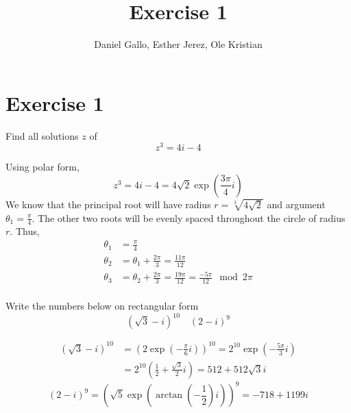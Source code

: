 \documentclass{report}
\title{Exercise 1}
\author{Daniel Gallo, Esther Jerez, Ole Kristian}
\renewcommand{\exp}[1]{\operatorname{exp}\left(#1\right)}
\renewcommand{\arctan}[1]{\operatorname{arctan} \left(#1\right)}
\begin{document}
    \maketitle
    
    \section*{Exercise 1}
    \begin{tcolorbox}[title=Part a]
        Find all solutions $z$ of
        \begin{equation*}
            z^3 = 4i - 4
        \end{equation*}
    \end{tcolorbox}
    \noindent
    Using polar form,
    \begin{equation*}
        z^3 = 4i - 4 = 4\sqrt{2}\exp{\frac{3\pi}{4}i}
    \end{equation*}
    We know that the principal root will have radius $r = \sqrt[3]{4\sqrt{2}}$ and argument $\theta_1 = \frac{\pi}{4}$. The other two roots will be evenly spaced throughout the circle of radius $r$. Thus,
    \begin{align*}
        \theta_1 &= \frac{\pi}{4} \\
        \theta_2 &= \theta_1 + \frac{2\pi}{3} = \frac{11\pi}{12} \\
        \theta_3 &= \theta_2 + \frac{2\pi}{3} = \frac{19\pi}{12} = \frac{-5\pi}{12} \mod{2\pi}\\
    \end{align*}
    \begin{tcolorbox}[title=Part b]
        Write the numbers below on rectangular form
        \begin{equation*}
            (\sqrt{3} - i)^{10} \quad (2 - i)^{9}
        \end{equation*}
    \end{tcolorbox}
    \begin{align*}
        (\sqrt{3} - i)^{10} &= \left(2\exp{-\frac{\pi}{6}i}\right)^{10} = 2^{10}\exp{-\frac{5\pi}{3}i} \\
        &= 2^{10}\left(\frac{1}{2} + \frac{\sqrt{3}}{2}i\right) = 512 + 512\sqrt{3}i
    \end{align*}
    \begin{equation*}
        (2 - i)^{9} = \left(\sqrt{5}\exp{\arctan{-\frac{1}{2}}i}\right)^{9} = -718 + 1199i
    \end{equation*}
\end{document}
